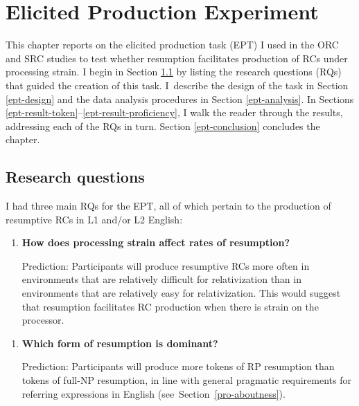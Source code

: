
\chapter{Elicited Production Experiment}\label{ch-ept}


This chapter reports on the elicited production task (EPT) I used in the ORC and SRC studies to test whether resumption facilitates production of RCs under processing strain. I begin in Section \ref{ept-rq} by listing the research questions (RQs) that guided the creation of this task. I~describe the design of the task in Section \ref{ept-design} and the data analysis procedures in Section \ref{ept-analysis}. In Sections \ref{ept-result-token}--\ref{ept-result-proficiency}, I walk the reader through the results, addressing each of the RQs in turn. Section \ref{ept-conclusion} concludes the chapter.

\section{Research questions}\label{ept-rq}

I had three main RQs for the EPT, all of which pertain to the production of resumptive RCs in L1 and/or L2 English:\vspace{5pt}

\begin{enumerate}[\bfseries RQ1:,itemsep=5pt]
\item {\bfseries How does processing strain affect rates of resumption?}\par\nobreak
Prediction: Participants will produce resumptive RCs more often in environments that are relatively difficult for relativization than in environments that are relatively easy for relativization. This would suggest that resumption facilitates RC production when there is strain on the processor.
\end{enumerate}\vspace{5pt}

\begin{enumerate}[\bfseries RQ2:,itemsep=5pt]
\item {\bfseries Which form of resumption is dominant?}\par\nobreak
Prediction: Participants will produce more tokens of RP resumption than tokens of full-NP resumption, in line with general pragmatic requirements for referring expressions in English (see~Section~\ref{pro-aboutness}).
\end{enumerate}\vspace{5pt}

